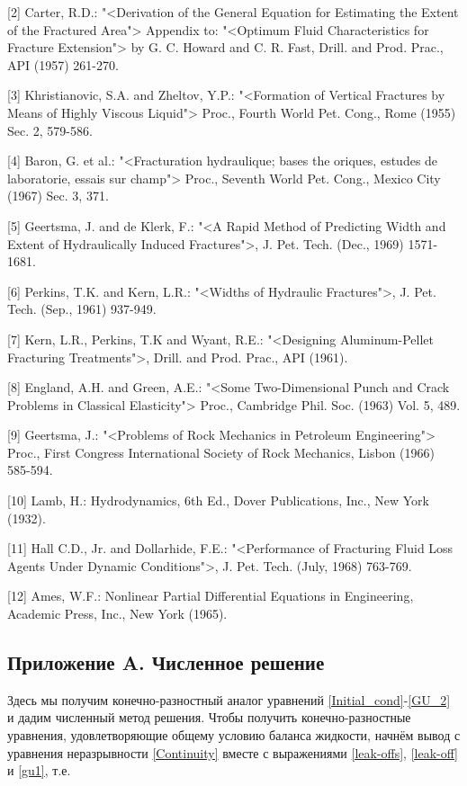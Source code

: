 \documentclass[a4paper, 12pt]{article}
\begin{document}
[2] Carter, R.D.: "<Derivation of the General Equation for Estimating the Extent of the Fractured Area"> Appendix to: "<Optimum Fluid Characteristics for Fracture Extension"> by G. C. Howard and C. R. Fast, Drill. and Prod. Prac., API (1957) 261-270.

[3] Khristianovic, S.A. and Zheltov, Y.P.: "<Formation of Vertical Fractures by Means of Highly Viscous Liquid"> Proc., Fourth World Pet. Cong., Rome (1955) Sec. 2, 579-586.

[4] Baron, G. et al.: "<Fracturation hydraulique; bases the oriques, estudes de laboratorie, essais sur champ"> Proc., Seventh World Pet. Cong., Mexico City (1967) Sec. 3, 371.

[5] Geertsma, J. and de Klerk, F.: "<A Rapid Method of Predicting Width and Extent of Hydraulically Induced Fractures">, J. Pet. Tech. (Dec., 1969) 1571-1681.

[6] Perkins, T.K. and Kern, L.R.: "<Widths of Hydraulic Fractures">, J. Pet. Tech. (Sep., 1961) 937-949.

[7] Kern, L.R., Perkins, T.K and Wyant, R.E.: "<Designing Aluminum-Pellet Fracturing Treatments">, Drill. and Prod. Prac., API (1961).

[8] England, A.H. and Green, A.E.: "<Some Two-Dimensional Punch and Crack Problems in Classical Elasticity"> Proc., Cambridge Phil. Soc. (1963) Vol. 5, 489.

[9] Geertsma, J.: "<Problems of Rock Mechanics in Petroleum Engineering"> Proc., First Congress International Society of Rock Mechanics, Lisbon (1966) 585-594.

[10] Lamb, H.: Hydrodynamics, 6th Ed., Dover Publications, Inc., New York (1932).

[11] Hall C.D., Jr. and Dollarhide, F.E.: "<Performance of Fracturing Fluid Loss Agents Under Dynamic Conditions">, J. Pet. Tech. (July, 1968) 763-769.

[12] Ames, W.F.: Nonlinear Partial Differential Equations in Engineering, Academic Press, Inc., New York (1965).

\setlength{\parindent}{20pt}

\subsection{Приложение A. Численное решение}

Здесь мы получим конечно-разностный аналог уравнений \eqref{Initial_cond}-\eqref{GU_2} и дадим численный метод решения.
Чтобы получить конечно-разностные уравнения, удовлетворяющие общему условию баланса жидкости, начнём вывод с уравнения неразрывности \eqref{Continuity} вместе с выражениями \eqref{leak-offs}, \eqref{leak-off} и \eqref{gu1}, т.е.
\end{document}
